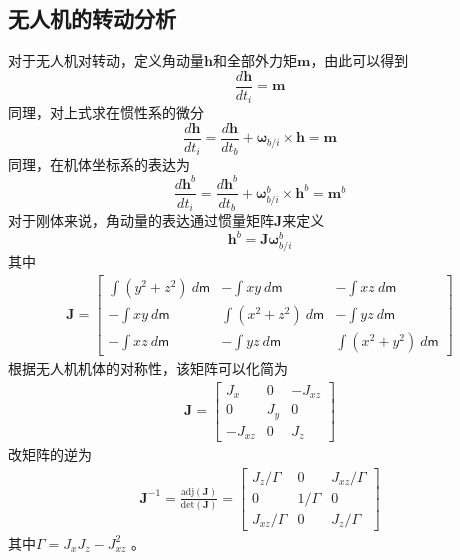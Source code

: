\subsection{无人机的转动分析}
对于无人机对转动，定义角动量$\mathbf{h}$和全部外力矩$\mathbf{m}$，由此可以得到
\begin{equation}
\frac{ d \mathbf{h}}{d t_i}=\mathbf{m}
\end{equation}
同理，对上式求在惯性系的微分
\begin{equation}
\frac{ d \mathbf{h}}{d t_i} = \frac{d\mathbf{h}}{dt_b} + \mathbf{\omega}_{b/i} \times \mathbf{h} = \mathbf{m}
\end{equation}
同理，在机体坐标系的表达为
\begin{equation}
\frac{ d \mathbf{h}^b}{d t_i} = \frac{d\mathbf{h}^b}{dt_b} + \mathbf{\omega}^b_{b/i} \times \mathbf{h}^b = \mathbf{m}^b
\end{equation}
对于刚体来说，角动量的表达通过惯量矩阵$\mathbf{J}$来定义
\begin{equation}
\mathbf{h}^b=\mathbf{J}  \mathbf{\omega}^b_{b/i}
\end{equation}
其中
\begin{align}
\mathbf{J} =\begin{bmatrix}	\int(y^2 + z^2)~d\mathsf{m} & -\int xy \ d\mathsf{m}        & -\int xz~d\mathsf{m} \\	-\int xy~d\mathsf{m}        & \int(x^2 + z^2)~d\mathsf{m} & -\int yz~d\mathsf{m} \\	-\int xz~d\mathsf{m}        & -\int yz~d\mathsf{m}  & \int(x^2 + y^2)~d\mathsf{m} \end{bmatrix}
\end{align}
根据无人机机体的对称性，该矩阵可以化简为
\begin{align}
\mathbf{J} = \begin{bmatrix}	J_x     & 0   & -J_{xz} \\	0       & J_y & 0       \\	-J_{xz} & 0   & J_z  \end{bmatrix}
\end{align}
改矩阵的逆为
\begin{align}
\mathbf{J}^{-1}=\frac{\mathrm{adj}(\mathbf{J}) }{\mathrm{det}(\mathbf{J}) } = \begin{bmatrix}	J_z / \Gamma     & 0   & J_{xz}/ \Gamma \\	0       & 1/ \Gamma & 0       \\	J_{xz}/ \Gamma & 0   & J_z/ \Gamma \end{bmatrix}
\end{align}
其中$ \Gamma = J_xJ_z - J_{xz}^2$ 。

